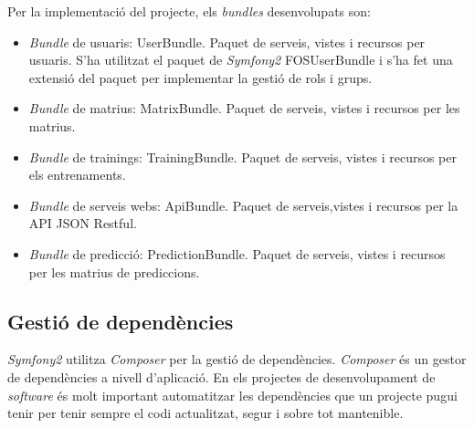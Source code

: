 Per la implementació del projecte, els \textit{bundles} desenvolupats son:
\begin{itemize}
\item \textit{Bundle} de usuaris: UserBundle. Paquet de serveis, vistes i recursos per usuaris. S'ha utilitzat el paquet de \textit{Symfony2} FOSUserBundle \cite{fosuserbundle} i s'ha fet una extensi\'{o} del paquet per implementar la gesti\'{o} de rols i grups. 
\item \textit{Bundle} de matrius: MatrixBundle. Paquet de serveis, vistes i recursos per les matrius.
\item \textit{Bundle} de trainings: TrainingBundle. Paquet de serveis, vistes i recursos per els entrenaments.
\item \textit{Bundle} de serveis webs: ApiBundle. Paquet de serveis,vistes i recursos per la API JSON Restful. 
\item \textit{Bundle} de predicci\'{o}: PredictionBundle. Paquet de serveis, vistes i recursos per les matrius de prediccions.
\end{itemize}

\subsection{Gesti\'{o} de depend\`{e}ncies} 
\label{subsec:dependencies}
\textit{Symfony2} utilitza \textit{Composer} per la gesti\'{o} de depend\`{e}ncies.\cite{composer} \textit{Composer} \'{e}s un gestor de dependències a nivell d'aplicaci\'{o}. En els projectes de desenvolupament de \textit{software} \'{e}s molt important automatitzar les dependències que un projecte pugui tenir per tenir sempre el codi actualitzat, segur i sobre tot mantenible.\\

